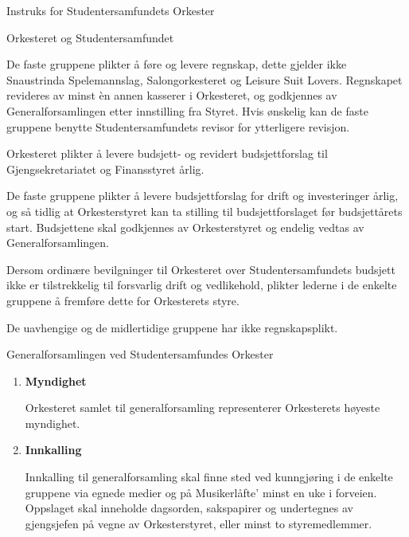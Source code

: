 \begin{instruks}{Instruks for Studentersamfundets Orkester}{ }{ }
\begin{instruksledd}{Orkesteret og Studentersamfundet}
\begin{enumerate}
\begin{enumerate}
                        De faste gruppene plikter å føre og levere regnskap, dette gjelder ikke Snaustrinda
                        Spelemannslag, Salongorkesteret og Leisure Suit Lovers. Regnskapet revideres av minst èn annen
                        kasserer i
                        Orkesteret, og godkjennes av Generalforsamlingen etter innstilling fra Styret. Hvis ønskelig kan de
                        faste
                        gruppene benytte Studentersamfundets revisor for ytterligere revisjon.

                        Orkesteret plikter å levere budsjett- og revidert budsjettforslag til Gjengsekretariatet og
                        Finansstyret årlig.

                        De faste gruppene plikter å levere budsjettforslag for drift og investeringer årlig, og så tidlig at
                        Orkesterstyret
                        kan ta stilling til budsjettforslaget før budsjettårets start. Budsjettene skal godkjennes av
                        Orkesterstyret og
                        endelig vedtas av Generalforsamlingen.

                        Dersom ordinære bevilgninger til Orkesteret over Studentersamfundets budsjett ikke er tilstrekkelig
                        til
                        forsvarlig drift og vedlikehold, plikter lederne i de enkelte gruppene å fremføre dette for
                        Orkesterets styre.

                        De uavhengige og de midlertidige gruppene har ikke regnskapsplikt.
                \end{enumerate}
        \end{enumerate}
    \end{instruksledd}

    \begin{instruksledd}{Generalforsamlingen ved Studentersamfundes Orkester}
        \begin{enumerate}
            \item \textbf{Myndighet}

                Orkesteret samlet til generalforsamling representerer Orkesterets høyeste myndighet.

            \item \textbf{Innkalling}

                Innkalling til generalforsamling skal finne sted ved kunngjøring i de enkelte gruppene via
                egnede medier og
                på Musikerlåfte' minst en uke i forveien. Oppslaget skal inneholde dagsorden, sakspapirer og
                undertegnes av
                gjengsjefen på vegne av Orkesterstyret, eller minst to styremedlemmer.


\end{enumerate}
\end{instruksledd}
\end{instruks}
